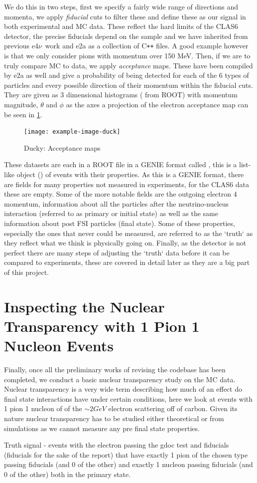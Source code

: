 \documentclass[a4paper,12pt]{article}
\newcommand{\efn}{e4$\nu$}
\newcommand{\verbb}[1]{\text{\verb|#1}}
\begin{document}
We do this in two steps, first we specify a fairly wide range of directions and momenta, we apply \emph{fiducial} cuts to filter these and define these as our signal in both experimental and MC data.
These reflect the hard limits of the CLAS6 detector, the precise fiducials depend on the sample and we have inherited from previous \efn\ work and e2a as a collection of C\texttt{++} files.
A good example however is that we only consider pions with momentum over 150 \si{MeV}.
Then, if we are to truly compare MC to data, we apply \emph{acceptance} maps.
These have been compiled by e2a as well and give a probability of being detected for each of the 6 types of particles and every possible direction of their momentum within the fiducial cuts.
They are given as 3 dimensional histograms (\verbb{TH3F} from ROOT) with momentum magnitude, $\theta$ and $\phi$ as the axes a projection of the electron acceptance map can be seen in \cref{fig:acc_map}.

\begin{figure}[H]
\centering
    \texttt{[image: example-image-duck]}
    \caption{
        Ducky: Acceptance maps
    }\label{fig:acc_map}
\end{figure}

These datasets are each in a ROOT file in a GENIE format called \verbb{gst}, this is a list-like object (\verbb{TTree}) of events with their properties.
As this is a GENIE format, there are fields for many properties not measured in experiments, for the CLAS6 data these are empty.
Some of the more notable fields are the outgoing electron 4 momentum, information about all the particles after the neutrino-nucleus interaction (referred to as primary or initial state) as well as the same information about post FSI particles (final state).
Some of these properties, especially the ones that never could be measured, are referred to as the `truth` as they reflect what we think is physically going on.
Finally, as the detector is not perfect there are many steps of adjusting the `truth` data before it can be compared to experiments, these are covered in detail later as they are a big part of this project.

\section{Inspecting the Nuclear Transparency with 1 Pion 1 Nucleon Events}
Finally, once all the preliminary works of revising the codebase has been completed, we conduct a basic nuclear transparency study on the MC data.
Nuclear transparency is a very wide term describing how much of an effect do final state interactions have under certain conditions, here we look at events with 1 pion 1 nucleon of of the $\sim 2\si{GeV}$ electron scattering off of carbon.
Given its nature nuclear transparency has to be studied either theoretical or from simulations as we cannot measure any pre final state properties.

Truth signal - events with the electron passing the gdoc test and fiducials (fiducials for the sake of the report) that have exactly 1 pion of the chosen type passing fiducials (and 0 of the other) and exactly 1 nucleon passing fiducials (and 0 of the other) both in the primary state.


\printbibliography
\end{document}
